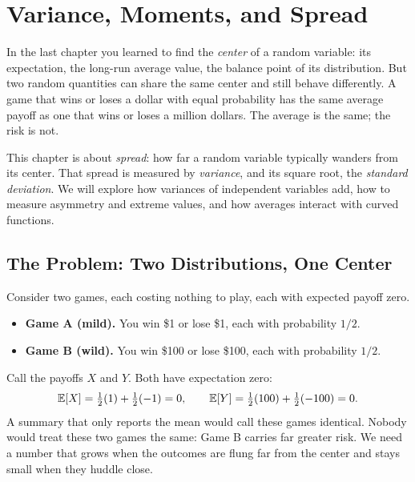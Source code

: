 \chapter{Variance, Moments, and Spread}

In the last chapter you learned to find the \emph{center} of a random
variable: its expectation, the long-run average value, the balance point of
its distribution. But two random quantities can share the same center and still
behave differently. A game that wins or loses a dollar with equal probability
has the same average payoff as one that wins or loses a million dollars. The
average is the same; the risk is not.

This chapter is about \emph{spread}: how far a random variable typically
wanders from its center. That spread is measured by \emph{variance}, and its
square root, the \emph{standard deviation}. We will explore how variances of
independent variables add, how to measure asymmetry and extreme values,
and how averages interact with curved functions.

\chapterline

\section{The Problem: Two Distributions, One Center}
\label{ch09:problem}

Consider two games, each costing
nothing to play, each with expected payoff zero.

\begin{itemize}
  \item \textbf{Game A (mild).} You win \$1 or lose \$1, each with
        probability $1/2$.
  \item \textbf{Game B (wild).} You win \$100 or lose \$100, each with
        probability $1/2$.
\end{itemize}

Call the payoffs $X$ and $Y$. Both have expectation zero:
\[
  \operatorname{\mathbb{E}}[X] = \tfrac12(1) + \tfrac12(-1) = 0,
  \qquad
  \operatorname{\mathbb{E}}[Y] = \tfrac12(100) + \tfrac12(-100) = 0.
\]
A summary that only reports the mean would call these games identical.
Nobody would treat these two games the same: Game B carries far greater risk.
We need a number that grows when the outcomes are flung far from the center and
stays small when they huddle close.

